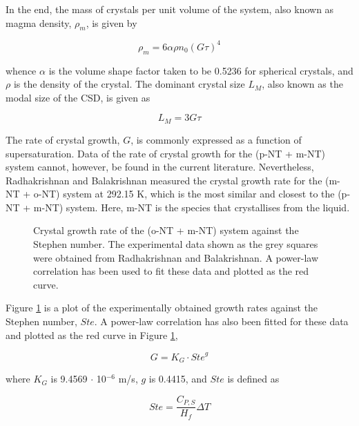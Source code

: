 In the end, the mass of crystals per unit volume of the system, also known as magma density, $\rho_m$, is given by

\begin{equation} \label{eq:magma density}
    \rho_m = 6 \alpha \rho n_0 (G \tau)^4
\end{equation}

\noindent whence $\alpha$ is the volume shape factor taken to be 0.5236 for spherical crystals, and $\rho$ is the density of the crystal. The dominant crystal size $L_M$, also known as the modal size of the CSD, is given as 

\begin{equation} \label{eq:LM G tau}
    L_M = 3 G \tau
\end{equation}

The rate of crystal growth, $G$, is commonly expressed as a function of supersaturation. Data of the rate of crystal growth for the (p-NT + m-NT) system cannot, however, be found in the current literature. Nevertheless, Radhakrishnan and Balakrishnan measured the crystal growth rate for the (m-NT + o-NT) system at 292.15 K, which is the most similar and closest to the (p-NT + m-NT) system. \cite{radhakrishnan_kinetics_1999} Here, m-NT is the species that crystallises from the liquid.

\begin{figure}[h]
    \centering
    
    \caption{Crystal growth rate of the (o-NT + m-NT) system against the Stephen number. The experimental data shown as the grey squares were obtained from Radhakrishnan and Balakrishnan. \cite{radhakrishnan_kinetics_1999} A power-law correlation has been used to fit these data and plotted as the red curve.}
    \label{fig:o-NT + m-NT kinetics}
\end{figure}

Figure \ref{fig:o-NT + m-NT kinetics} is a plot of the experimentally obtained growth rates against the Stephen number, $Ste$. A power-law correlation has also been fitted for these data and plotted as the red curve in Figure \ref{fig:o-NT + m-NT kinetics},

\begin{equation}  \label{eq:KG Ste g}
    G = K_G \cdot {Ste}^{g}
\end{equation}

\noindent where $K_G$ is 9.4569 $\cdot$ 10$^{-6}$ m/s, $g$ is 0.4415, and $Ste$ is defined as 

\begin{equation}
    Ste = \frac{C_{P,S}}{H_{f}} \Delta T
\end{equation}

